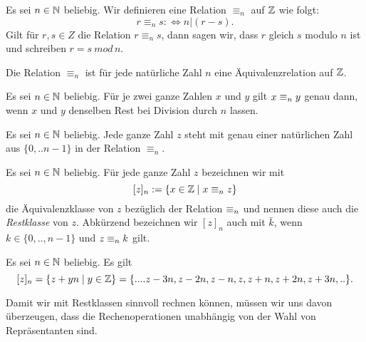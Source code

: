 \begin{df}
Es sei $n\in\mathbb{N}$ beliebig. Wir definieren eine Relation $\equiv_n$ auf $\mathbb{Z}$ wie folgt:
\[
 r\equiv_n s:\Leftrightarrow n|(r-s).
\]
Gilt für $r,s\in Z$ die Relation $r\equiv_ns$, dann sagen wir, dass $r$ gleich $s$ modulo $n$ ist und schreiben $r=s \:mod\, n$.
\end{df}


\begin{rk}
 Die Relation $\equiv_n$ ist für jede natürliche Zahl $n$ eine Äquivalenzrelation auf $\mathbb{Z}$.
\end{rk}

\begin{rk}
Es sei $n\in\mathbb{N}$ beliebig. Für je zwei ganze Zahlen $x$ und $y$ gilt $x\equiv_n y$ genau dann, wenn $x$ und $y$ denselben Rest bei Division durch $n$ lassen.
\end{rk}


\begin{cor}
 Es sei $n\in\mathbb{N}$ beliebig. Jede ganze Zahl $z$ steht mit genau einer natürlichen Zahl aus $\{0,..n-1\}$ in der Relation $\equiv_n$.
\end{cor}

\begin{df}
Es sei $n\in\mathbb{N}$ beliebig. Für jede ganze Zahl $z$ bezeichnen wir mit
\[
 [z]_n:=\{x\in\mathbb{Z}\mid x\equiv_n z\}
\]
die Äquivalenzklasse von $z$ bezüglich der Relation $\equiv_n$ und nennen diese auch die \textit{Restklasse} von $z$. Abkürzend bezeichnen wir $[z]_n$ auch mit $\bar k$, wenn $k\in\{0,..,n-1\}$ und $z\equiv_n k$ gilt.
\end{df}

\begin{cor}
Es sei $n\in\mathbb{N}$ beliebig. Es gilt
\[
 [z]_n=\{z+yn\mid y\in\mathbb{Z}\}=\{....z-3n,z-2n,z-n,z,z+n,z+2n,z+3n,..\}.
\]
\end{cor}



Damit wir mit Restklassen sinnvoll rechnen können, müssen wir uns davon überzeugen, dass die Rechenoperationen unabhängig von der Wahl von Repräsentanten sind.

